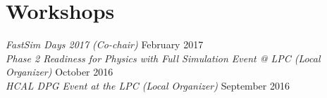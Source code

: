 \section{Workshops}
{\sl FastSim Days 2017 (Co-chair)} \hfill February 2017\\
{\sl Phase 2 Readiness for Physics with Full Simulation Event @ LPC (Local Organizer)} \hfill October 2016\\
{\sl HCAL DPG Event at the LPC (Local Organizer)} \hfill September 2016%
